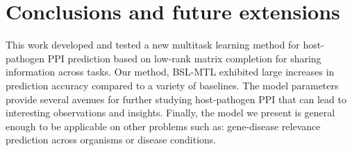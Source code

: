 \documentclass{bioinfo}
\begin{document}
\section{Conclusions and future extensions}
This work developed and tested a new multitask learning method for host-pathogen PPI prediction based on low-rank matrix completion for sharing information across tasks. Our method, BSL-MTL exhibited large increases in prediction accuracy compared to a variety of baselines.
The model parameters provide several avenues for further studying host-pathogen PPI that can lead to interesting observations and insights. Finally, the model we present is general enough to be applicable on other problems such as: gene-disease relevance prediction across organisms or disease conditions. 





%



\begin{scriptsize}

\end{scriptsize}
\end{document}
